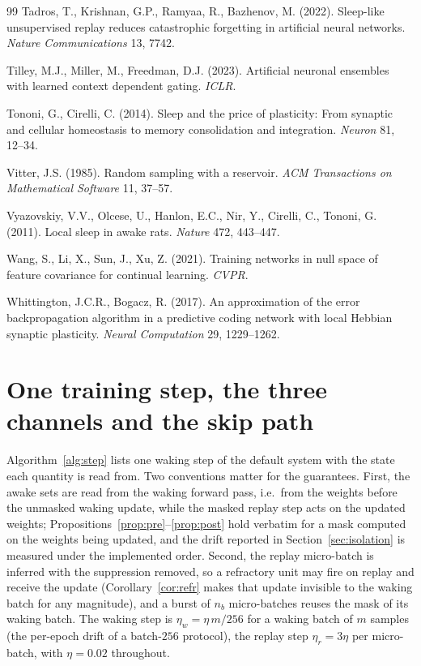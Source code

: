 \documentclass{article}
\begin{document}
\begin{thebibliography}{99}
 Tadros, T., Krishnan, G.P., Ramyaa, R., Bazhenov, M. (2022). Sleep-like unsupervised replay reduces catastrophic forgetting in artificial neural networks. \emph{Nature Communications} 13, 7742.

 Tilley, M.J., Miller, M., Freedman, D.J. (2023). Artificial neuronal ensembles with learned context dependent gating. \emph{ICLR}.

 Tononi, G., Cirelli, C. (2014). Sleep and the price of plasticity: From synaptic and cellular homeostasis to memory consolidation and integration. \emph{Neuron} 81, 12--34.

 Vitter, J.S. (1985). Random sampling with a reservoir. \emph{ACM Transactions on Mathematical Software} 11, 37--57.

 Vyazovskiy, V.V., Olcese, U., Hanlon, E.C., Nir, Y., Cirelli, C., Tononi, G. (2011). Local sleep in awake rats. \emph{Nature} 472, 443--447.

 Wang, S., Li, X., Sun, J., Xu, Z. (2021). Training networks in null space of feature covariance for continual learning. \emph{CVPR}.

 Whittington, J.C.R., Bogacz, R. (2017). An approximation of the error backpropagation algorithm in a predictive coding network with local Hebbian synaptic plasticity. \emph{Neural Computation} 29, 1229--1262.

\end{thebibliography}

\clearpage
\appendix

\section{One training step, the three channels and the skip path}
\label{app:alg}
Algorithm~\ref{alg:step} lists one waking step of the default system with the state each
quantity is read from. Two conventions matter for the guarantees. First, the awake sets are
read from the waking forward pass, i.e.\ from the weights before the unmasked waking update,
while the masked replay step acts on the updated weights;
Propositions~\ref{prop:pre}--\ref{prop:post} hold verbatim for a mask computed on the weights
being updated, and the drift reported in Section~\ref{sec:isolation} is measured under the
implemented order. Second, the replay micro-batch is inferred with the suppression removed,
so a refractory unit may fire on replay and receive the update (Corollary~\ref{cor:refr}
makes that update invisible to the waking batch for any magnitude), and a burst of $n_b$
micro-batches reuses the mask of its waking batch. The waking step is $\eta_w=\eta\,m/256$
for a waking batch of $m$ samples (the per-epoch drift of a batch-$256$ protocol), the replay
step $\eta_r=3\eta$ per micro-batch, with $\eta=0.02$ throughout.
\end{document}
